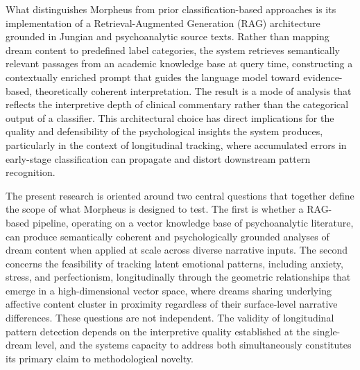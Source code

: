 \documentclass[12pt,a4paper]{report}
\begin{document}
What distinguishes Morpheus from prior classification-based approaches is its implementation of a Retrieval-Augmented Generation (RAG) architecture grounded in Jungian and psychoanalytic source texts. Rather than mapping dream content to predefined label categories, the system retrieves semantically relevant passages from an academic knowledge base at query time, constructing a contextually enriched prompt that guides the language model toward evidence-based, theoretically coherent interpretation. The result is a mode of analysis that reflects the interpretive depth of clinical commentary rather than the categorical output of a classifier. This architectural choice has direct implications for the quality and defensibility of the psychological insights the system produces, particularly in the context of longitudinal tracking, where accumulated errors in early-stage classification can propagate and distort downstream pattern recognition.

The present research is oriented around two central questions that together define the scope of what Morpheus is designed to test. The first is whether a RAG-based pipeline, operating on a vector knowledge base of psychoanalytic literature, can produce semantically coherent and psychologically grounded analyses of dream content when applied at scale across diverse narrative inputs. The second concerns the feasibility of tracking latent emotional patterns, including anxiety, stress, and perfectionism, longitudinally through the geometric relationships that emerge in a high-dimensional vector space, where dreams sharing underlying affective content cluster in proximity regardless of their surface-level narrative differences. These questions are not independent. The validity of longitudinal pattern detection depends on the interpretive quality established at the single-dream level, and the system\textquotesingle{}s capacity to address both simultaneously constitutes its primary claim to methodological novelty.
\end{document}
